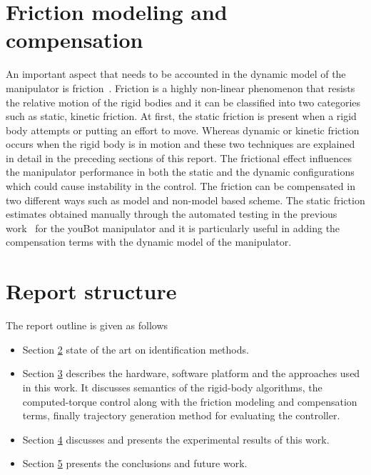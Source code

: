 \section*{Friction modeling and compensation}

An important aspect that needs to be accounted in the dynamic model of the manipulator is friction~\cite{olsson1998friction}. Friction is a highly non-linear phenomenon that resists the relative motion of the rigid bodies and it can be classified into two categories such as static, kinetic friction. At first, the static friction is present when a rigid body attempts or putting an effort to move. Whereas dynamic or kinetic friction occurs when the rigid body is in motion and these two techniques are explained in detail in the preceding sections of this report. The frictional effect influences the manipulator performance in both the static and the dynamic configurations which could cause instability in the control. The friction can be compensated in two different ways such as model and non-model based scheme. The static friction estimates obtained manually through the automated testing in the previous work~\cite{RnD2Rajagopal} for the youBot manipulator and it is particularly useful in adding the compensation terms with the dynamic model of the manipulator.

\section*{Report structure}

The report outline is given as follows

\begin{itemize}
\item Section \hyperref[sec:stateoftheart]{2} state of the art on identification methods.
\item Section \hyperref[sec:approach]{3} describes the hardware, software platform and the approaches used in this work. It discusses semantics of the rigid-body algorithms, the computed-torque control along with the friction modeling and compensation terms, finally trajectory generation method for evaluating the controller.
\item Section \hyperref[sec:experiments]{4} discusses and presents the experimental results of this work.
\item Section \hyperref[sec:conclusion]{5} presents the conclusions and future work.
\end{itemize}